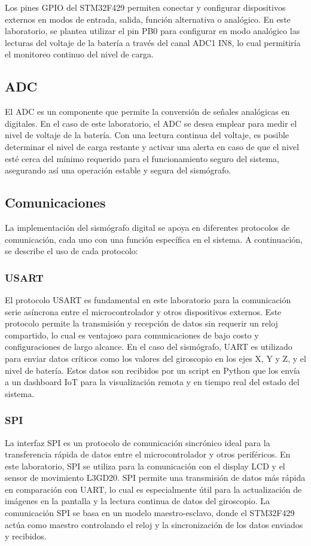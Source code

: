 \documentclass[12pt,a4paper]{article}
\begin{document}
Los pines GPIO del STM32F429 \cite{gpio} permiten conectar y configurar dispositivos externos en modos de entrada, salida, función alternativa o analógico. En este laboratorio, se plantea utilizar el pin PB0 para configurar en modo analógico las lecturas del voltaje de la batería a través del canal ADC1 IN8, lo cual permitiría el monitoreo continuo del nivel de carga.

\subsection{ADC}
El ADC es un componente que permite la conversión de señales analógicas en digitales. En el caso de este laboratorio, el ADC se desea emplear para medir el nivel de voltaje de la batería. Con una lectura continua del voltaje, es posible determinar el nivel de carga restante y activar una alerta en caso de que el nivel esté cerca del mínimo requerido para el funcionamiento seguro del sistema, asegurando así una operación estable y segura del sismógrafo. \cite{hoja}

\subsection{Comunicaciones}
La implementación del sismógrafo digital se apoya en diferentes protocolos de comunicación, cada uno con una función específica en el sistema. A continuación, se describe el uso de cada protocolo:

\subsubsection{USART}
 El protocolo USART \cite{usart} es fundamental en este laboratorio para la comunicación serie asíncrona entre el microcontrolador y otros dispositivos externos. Este protocolo permite la transmisión y recepción de datos sin requerir un reloj compartido, lo cual es ventajoso para comunicaciones de bajo costo y configuraciones de largo alcance. En el caso del sismógrafo, UART es utilizado para enviar datos críticos como los valores del giroscopio en los ejes X, Y y Z, y el nivel de batería. Estos datos son recibidos por un script en Python que los envía a un dashboard IoT para la visualización remota y en tiempo real del estado del sistema. 

\subsubsection{SPI}
La interfaz SPI \cite{spi} es un protocolo de comunicación sincrónico ideal para la transferencia rápida de datos entre el microcontrolador y otros periféricos. En este laboratorio, SPI se utiliza para la comunicación con el display LCD y el sensor de movimiento L3GD20. SPI permite una transmisión de datos más rápida en comparación con UART, lo cual es especialmente útil para la actualización de imágenes en la pantalla y la lectura continua de datos del giroscopio. La comunicación SPI se basa en un modelo maestro-esclavo, donde el STM32F429 actúa como maestro controlando el reloj y la sincronización de los datos enviados y recibidos. 
\end{document}
